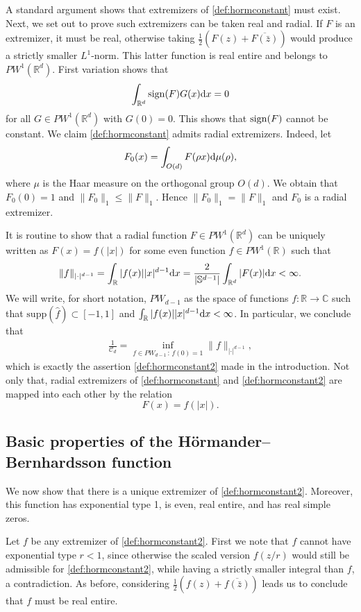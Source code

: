 \documentclass[a4paper,reqno,12pt]{amsart}
\newcommand{\C}{\mathscr{C}}
\renewcommand{\r}{\mathbb{R}}
\newcommand{\cp}{\mathbb{C}} %
\newcommand{\ft}{\widehat}
\renewcommand{\d}{{\rm d}}
\newcommand{\sign}{{\rm sign}}
\renewcommand{\sp}{\mathbb{S}}
\begin{document}
A standard argument shows that extremizers of \eqref{def:hormconstant} must exist. Next, we set out to prove such extremizers can be taken real and radial. If $F$ is an extremizer, it must be real, otherwise taking $\frac12 (F(z) + \overline{F(\bar z)})$ would produce a strictly smaller $L^1$-norm. This latter function is real entire and belongs to  $PW^1(\r^d)$. 
First variation shows that 
$$
\int_{\r^d} \sign(F) G(x) \d x = 0
$$
for all $G\in PW^1(\r^d)$ with $G(0)=0$. This shows that $\sign(F)$ cannot be constant. We claim \eqref{def:hormconstant} admits radial extremizers. Indeed, let
$$
F_0(x) = \int_{O(d)} F(\rho x) \d \mu(\rho),
$$
where $\mu$ is the Haar measure on the orthogonal group $O(d)$. We obtain that $F_0(0)=1$ and $\|F_0\|_1 \leq \|F\|_1$. 
Hence $\|F_0\|_1 = \|F\|_1$ and $F_0$ is a radial extremizer. 


It is routine to show that a radial function $F\in PW^1(\r^d)$ can be uniquely written as
$F(x)=f(|x|)$ for some even function $f\in PW^1(\r)$ such that 
$$
\|f\|_{|\cdot|^{d-1}}=\int_\r |f(x)||x|^{d-1}\d x = \frac{2}{|\sp^{d-1}|} \int_{\r^d} |F(x)|\d x <\infty.
$$
We will write, for short notation, $PW_{d-1}$ as the space of functions $f:\r\to\cp$ such that $\text{supp}(\ft f)\subset [-1,1]$ and $\int_\r |f(x)||x|^{d-1}\d x<\infty$. In particular, we conclude that
\begin{align}
\frac{1}{\C_d}=  \inf_{f\in PW_{d-1} \, : \,  f(0)=1} \|f\|_{|\cdot|^{d-1}},
\end{align}
which is exactly the assertion \eqref{def:hormconstant2} made in the introduction. Not only that, radial extremizers of \eqref{def:hormconstant} and \eqref{def:hormconstant2} are mapped into each other by the relation 
$$
F(x)=f(|x|).
$$

\subsection{Basic properties of the H\"ormander--Bernhardsson function}We now show that there is a unique extremizer of \eqref{def:hormconstant2}. Moreover, this function has exponential type 1, is even, real entire, and has real simple zeros. 

Let $f$ be any extremizer of  \eqref{def:hormconstant2}. First we note that $f$ cannot have exponential type $r < 1$, since otherwise the scaled version $f(z/r)$ would still be admissible for \eqref{def:hormconstant2}, while having a strictly smaller integral than $f$, a contradiction.
As before, considering $\frac12 (f(z) + \overline{f(\bar z)})$ leads us to conclude that $f$ must be real entire.
\end{document}
